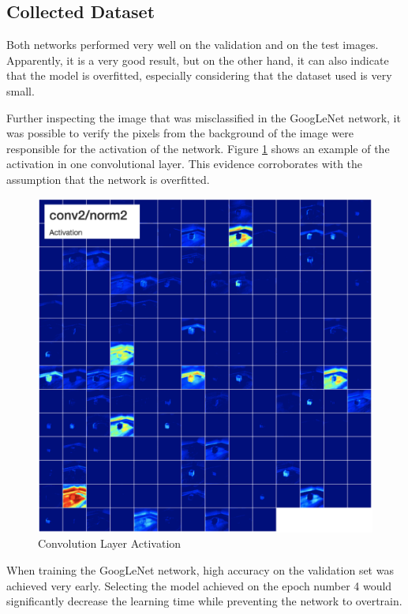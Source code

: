 \documentclass[10pt,journal,compsoc]{IEEEtran}
\begin{document}
\subsection{Collected Dataset}

Both networks performed very well on the validation and on the test images. Apparently, it is a very good result, but on the other hand, it can also indicate that the model is overfitted, especially considering that the dataset used is very small.
 
Further inspecting the image that was misclassified in the GoogLeNet network, it was possible to verify the pixels from the background of the image were responsible for the activation of the network. Figure \ref{fig:activation} shows an example of the activation in one convolutional layer. This evidence corroborates with the assumption that the network is overfitted. 
\begin{figure}[thpb]
      \centering
      \includegraphics[width=\linewidth]{o_err2.png}
      \caption{Convolution Layer Activation}
      \label{fig:activation}
\end{figure}

When training the GoogLeNet network, high accuracy on the validation set was achieved very early. Selecting the model achieved on the epoch number 4 would significantly decrease the learning time while preventing the network to overtrain.
\end{document}
